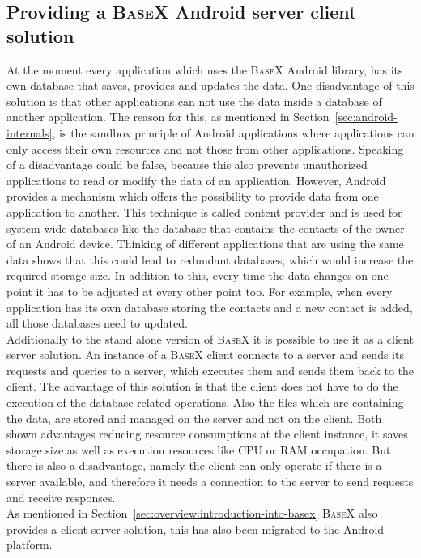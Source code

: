 \subsection{Providing a \textsc{BaseX} Android server client solution}
\label{sec:migration:providing-a-server-client-solution}
At the moment every application which uses the \textsc{BaseX} Android library, has its own database that saves, provides and updates the data.
One disadvantage of this solution is that other applications can not use the data inside a database of another application.
The reason for this, as mentioned in Section~\ref{sec:android-internals}, is the sandbox principle of Android applications where applications can only access their own resources and not those from other applications.
Speaking of a disadvantage could be false, because this also prevents unauthorized applications to read or modify the data of an application.
However, Android provides a mechanism which offers the possibility to provide data from one application to another.
This technique is called content provider and is used for system wide databases like the database that contains the contacts of the owner of an Android device.
Thinking of different applications that are using the same data shows that this could lead to redundant databases, which would increase the required storage size.
In addition to this, every time the data changes on one point it has to be adjusted at every other point too.
For example, when every application has its own database storing the contacts and a new contact is added, all those databases need to updated.\\
Additionally to the stand alone version of \textsc{BaseX} it is possible to use it as a client server solution.
An instance of a \textsc{BaseX} client connects to a server and sends its requests and queries to a server, which executes them and sends them back to the client.
The advantage of this solution is that the client does not have to do the execution of the database related operations.
Also the files which are containing the data, are stored and managed on the server and not on the client.
Both shown advantages reducing resource consumptions at the client instance, it saves storage size as well as execution resources like CPU or RAM occupation.
But there is also a disadvantage, namely the client can only operate if there is a server available, and therefore it needs a connection to the server to send requests and receive responses.\\
As mentioned in Section~\ref{sec:overview:introduction-into-basex} \textsc{BaseX} also provides a client server solution, this has also been migrated to the Android platform.
